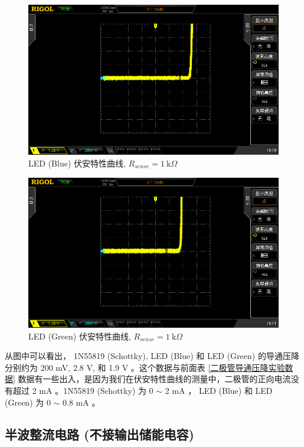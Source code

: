 \documentclass[UTF8]{article}
\begin{document}
\begin{figure}[H]\centering
    \includegraphics[width=\columnwidth]{LCE-01-二极管/assets/二极管伏安特性曲线/LED Blue.png}
    \caption{LED (Blue) 伏安特性曲线, $R_{sense} = 1 \ \mathrm{k}\Omega$}
\end{figure}

\begin{figure}[H]\centering
    \includegraphics[width=\columnwidth]{LCE-01-二极管/assets/二极管伏安特性曲线/LED Green.png}
    \caption{LED (Green) 伏安特性曲线, $R_{sense} = 1 \ \mathrm{k}\Omega$}
\end{figure}

从图中可以看出， 1N55819 (Schottky), LED (Blue) 和 LED (Green) 的导通压降分别约为 200 mV, 2.8 V, 和 1.9 V 。这个数据与前面表 \ref{二极管导通压降实验数据} 数据有一些出入，是因为我们在伏安特性曲线的测量中，二极管的正向电流没有超过 2 mA 。1N55819 (Schottky) 为 0 $\sim$ 2 mA ， LED (Blue) 和 LED (Green) 为 0 $\sim$ 0.8 mA 。

\subsection{半波整流电路 (不接输出储能电容)}
\end{document}
